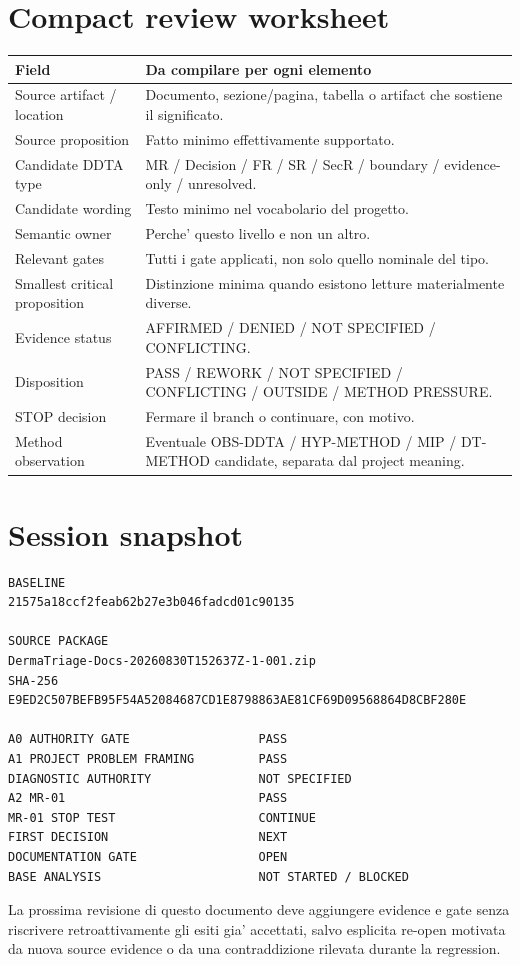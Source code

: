 \documentclass[11pt,a4paper]{article}
\begin{document}
\appendix
\section{Compact review worksheet}

\begin{longtable}{L{45mm}L{105mm}}
\toprule
\textbf{Field} & \textbf{Da compilare per ogni elemento} \\
\midrule
\endhead
Source artifact / location & Documento, sezione/pagina, tabella o artifact che sostiene il significato. \\
Source proposition & Fatto minimo effettivamente supportato. \\
Candidate DDTA type & MR / Decision / FR / SR / SecR / boundary / evidence-only / unresolved. \\
Candidate wording & Testo minimo nel vocabolario del progetto. \\
Semantic owner & Perche' questo livello e non un altro. \\
Relevant gates & Tutti i gate applicati, non solo quello nominale del tipo. \\
Smallest critical proposition & Distinzione minima quando esistono letture materialmente diverse. \\
Evidence status & AFFIRMED / DENIED / NOT SPECIFIED / CONFLICTING. \\
Disposition & PASS / REWORK / NOT SPECIFIED / CONFLICTING / OUTSIDE / METHOD PRESSURE. \\
STOP decision & Fermare il branch o continuare, con motivo. \\
Method observation & Eventuale OBS-DDTA / HYP-METHOD / MIP / DT-METHOD candidate, separata dal project meaning. \\
\bottomrule
\end{longtable}

\section*{Session snapshot}

\begin{lstlisting}
BASELINE
21575a18ccf2feab62b27e3b046fadcd01c90135

SOURCE PACKAGE
DermaTriage-Docs-20260830T152637Z-1-001.zip
SHA-256
E9ED2C507BEFB95F54A52084687CD1E8798863AE81CF69D09568864D8CBF280E

A0 AUTHORITY GATE                  PASS
A1 PROJECT PROBLEM FRAMING         PASS
DIAGNOSTIC AUTHORITY               NOT SPECIFIED
A2 MR-01                           PASS
MR-01 STOP TEST                    CONTINUE
FIRST DECISION                     NEXT
DOCUMENTATION GATE                 OPEN
BASE ANALYSIS                      NOT STARTED / BLOCKED
\end{lstlisting}

\begin{ddtacore}[title={Continuation invariant}]
La prossima revisione di questo documento deve aggiungere evidence e gate senza riscrivere retroattivamente gli esiti gia' accettati, salvo esplicita re-open motivata da nuova source evidence o da una contraddizione rilevata durante la regression.
\end{ddtacore}
\end{document}

